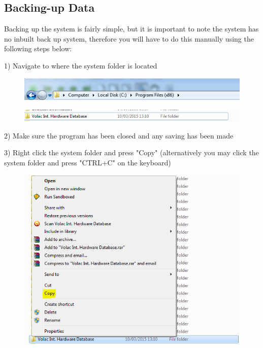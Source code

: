 \subsection{Backing-up Data}\label{backup}

Backing up the system is fairly simple, but it is important to note the system has no inbuilt back up system, therefore you will have to do this manually using the following steps below:

1) Navigate to where the system folder is located

\begin{figure}[H]
    \includegraphics[width=\textwidth]{./Manual/Images/backup1.png}
\end{figure}

\begin{figure}[H]
    \includegraphics[width=\textwidth]{./Manual/Images/backup2.png}
\end{figure}


2) Make sure the program has been closed and any saving has been made

3) Right click the system folder and press "Copy" (alternatively you may click the system folder and press "CTRL+C" on the keyboard)

\begin{figure}[H]
    \includegraphics[width=\textwidth]{./Manual/Images/backup3.png}
\end{figure}

